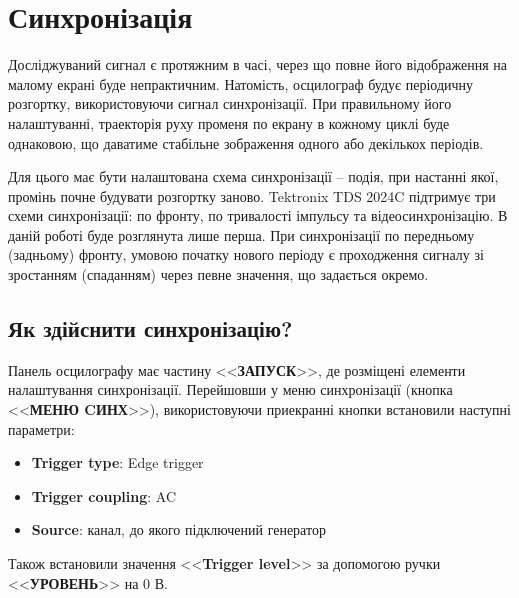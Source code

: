 \section{Синхронізація}
	
	Досліджуваний сигнал є протяжним в часі, через що повне його відображення на малому екрані буде непрактичним. Натомість, осцилограф будує періодичну розгортку, використовуючи сигнал синхронізації. При правильному його налаштуванні, траекторія руху променя по екрану в кожному циклі буде однаковою, що даватиме стабільне зображення одного або декількох періодів.
	
	Для цього має бути налаштована схема синхронізації -- подія, при настанні якої, промінь почне будувати розгортку заново. Tektronix TDS 2024C \cite{oscilloscope} підтримує три схеми синхронізації: по фронту, по тривалості імпульсу та відеосинхронізацію. В даній роботі буде розглянута лише перша. При синхронізації по передньому (задньому) фронту, умовою початку нового періоду є проходження сигналу зі зростанням (спаданням) через певне значення, що задається окремо.
	
	\subsection{Як здійснити синхронізацію?}
    Панель осцилографу має частину  <<\textbf{ЗАПУСК}>>, де розміщені елементи налаштування синхронізації. Перейшовши у меню синхронізації (кнопка <<\textbf{МЕНЮ CИНХ}>>), використовуючи приекранні кнопки встановили наступні параметри:
    \begin{itemize}
        \item \textbf{Trigger type}: Edge trigger
        \item \textbf{Trigger coupling}: AC
        \item \textbf{Source}: канал, до якого підключений генератор
    \end{itemize}
    Також встановили значення <<\textbf{Trigger level}>> за допомогою ручки <<\textbf{УРОВЕНЬ}>> на 0 В.